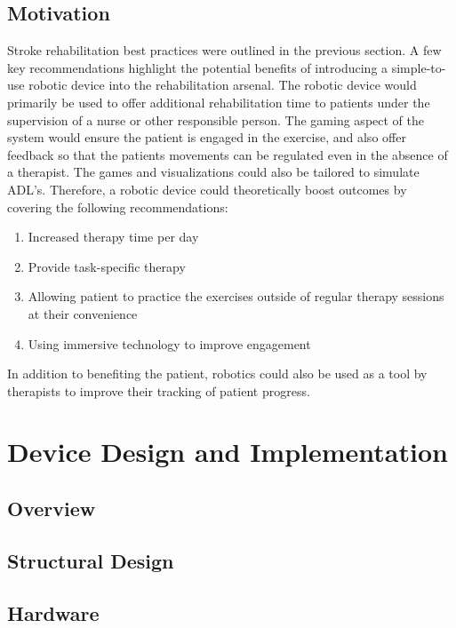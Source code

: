 \documentclass[12pt]{report}
\begin{document}
	\section{Motivation} 
Stroke rehabilitation best practices were outlined in the previous section. A few key recommendations highlight the potential benefits of introducing a simple-to-use robotic device into the rehabilitation arsenal. The robotic device would primarily be used to offer additional rehabilitation time to patients under the supervision of a nurse or other responsible person. The gaming aspect of the system would ensure the patient is engaged in the exercise, and also offer feedback so that the patients movements can be regulated even in the absence of a therapist. The games and visualizations could also be tailored to simulate ADL's. Therefore, a robotic device could theoretically boost outcomes by covering the following recommendations:
\begin{enumerate}
	\item Increased therapy time per day 
	\item Provide task-specific therapy
	\item Allowing patient to practice the exercises outside of regular therapy sessions at their convenience 
	\item Using immersive technology to improve engagement 
\end{enumerate}
In addition to benefiting the patient, robotics could also be used as a tool by therapists to improve their tracking of patient progress. 






\chapter{Device Design and Implementation}
	\section{Overview}

	
	
	\section{Structural Design}

		
	
	\section{Hardware}
\end{document}
